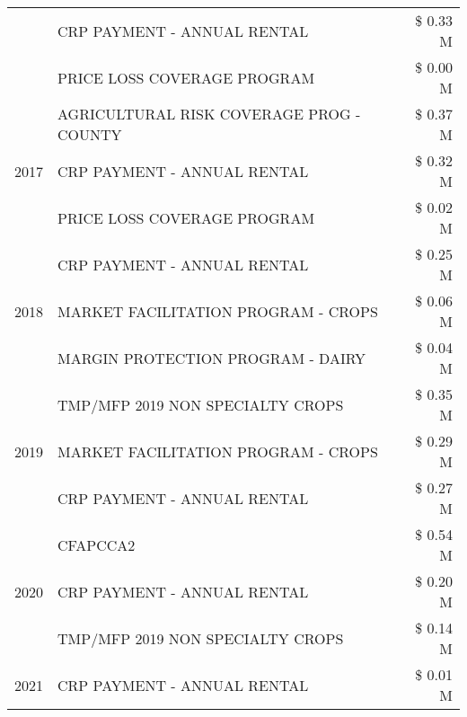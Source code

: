 \begin{tabular}{llr}
 & CRP PAYMENT - ANNUAL RENTAL & \$ 0.33 M \\
 & PRICE LOSS COVERAGE PROGRAM & \$ 0.00 M \\
\cline{1-3}
\multirow[t]{3}{*}{2017} & AGRICULTURAL RISK COVERAGE PROG - COUNTY & \$ 0.37 M \\
 & CRP PAYMENT - ANNUAL RENTAL & \$ 0.32 M \\
 & PRICE LOSS COVERAGE PROGRAM & \$ 0.02 M \\
\cline{1-3}
\multirow[t]{3}{*}{2018} & CRP PAYMENT - ANNUAL RENTAL & \$ 0.25 M \\
 & MARKET FACILITATION PROGRAM - CROPS & \$ 0.06 M \\
 & MARGIN PROTECTION PROGRAM - DAIRY & \$ 0.04 M \\
\cline{1-3}
\multirow[t]{3}{*}{2019} & TMP/MFP 2019 NON SPECIALTY CROPS & \$ 0.35 M \\
 & MARKET FACILITATION PROGRAM - CROPS & \$ 0.29 M \\
 & CRP PAYMENT - ANNUAL RENTAL & \$ 0.27 M \\
\cline{1-3}
\multirow[t]{3}{*}{2020} & CFAPCCA2 & \$ 0.54 M \\
 & CRP PAYMENT - ANNUAL RENTAL & \$ 0.20 M \\
 & TMP/MFP 2019 NON SPECIALTY CROPS & \$ 0.14 M \\
\cline{1-3}
2021 & CRP PAYMENT - ANNUAL RENTAL & \$ 0.01 M \\
\cline{1-3}
\bottomrule
\end{tabular}
